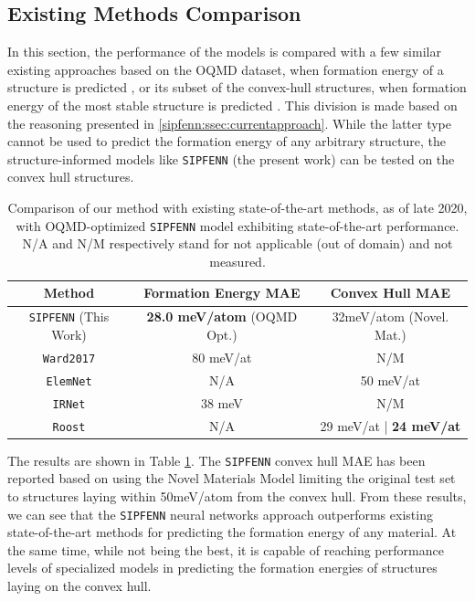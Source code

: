 \subsection{Existing Methods Comparison} \label{sipfenn:ssec:existing}
In this section, the performance of the models is compared with a few similar existing approaches based on the OQMD dataset, when formation energy of a structure is predicted \cite{Ward2016AMaterials, Ward2017IncludingTessellations, Jha2019IRNet}, or its subset of the convex-hull structures, when formation energy of the most stable structure is predicted \cite{Jha2018ElemNet:Composition, Goodall2020PredictingStoichiometry}.  This division is made based on the reasoning presented in \ref{sipfenn:ssec:currentapproach}. While the latter type cannot be used to predict the formation energy of any arbitrary structure, the structure-informed models like \texttt{SIPFENN} (the present work) can be tested on the convex hull structures. 


\begin{table}[H]
\begin{center}
\begin{tabular}{|c|c|c|}
\hline
 Method & Formation Energy MAE & Convex Hull MAE \\
 \hline
 \texttt{SIPFENN} (This Work) & \textbf{28.0 meV/atom} (OQMD Opt.) & 32meV/atom (Novel. Mat.) \\
 \texttt{Ward2017} \cite{Ward2016AMaterials, Ward2017IncludingTessellations} & 80 meV/at & N/M \\
 \texttt{ElemNet} \cite{Jha2018ElemNet:Composition} & N/A & 50 meV/at\\  
 \texttt{IRNet} \cite{Jha2019IRNet} & 38 meV & N/M \\
 \texttt{Roost} \cite{Goodall2020PredictingStoichiometry} & N/A & 29 meV/at | \textbf{24 meV/at}\\
 \hline
\end{tabular}
\caption{Comparison of our method with existing state-of-the-art methods, as of late 2020, with OQMD-optimized \texttt{SIPFENN} model exhibiting state-of-the-art performance. N/A and N/M respectively stand for not applicable (out of domain) and not measured.}
\label{sipfenn:comparison-results}
\end{center}
\vspace{-24pt}
\end{table}

The results are shown in Table \ref{sipfenn:comparison-results}. The \texttt{SIPFENN} convex hull MAE has been reported based on using the Novel Materials Model limiting the original test set to structures laying within 50meV/atom from the convex hull. From these results, we can see that the \texttt{SIPFENN} neural networks approach outperforms existing state-of-the-art methods for predicting the formation energy of any material. At the same time, while not being the best, it is capable of reaching performance levels of specialized models in predicting the formation energies of structures laying on the convex hull.

